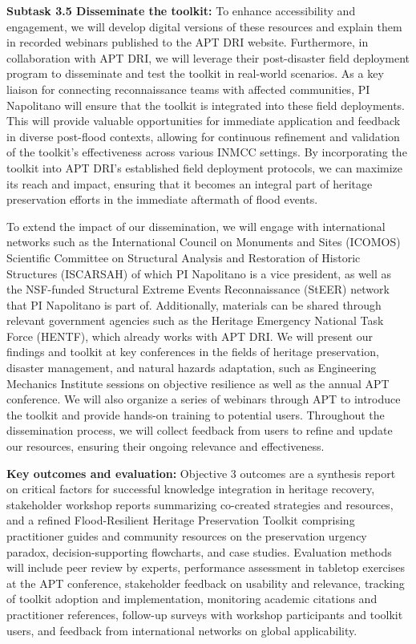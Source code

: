\documentclass[11pt]{article}
\begin{document}
\textbf{Subtask 3.5 Disseminate the toolkit:}
To enhance accessibility and engagement, we will develop digital versions of these resources and explain them in recorded webinars published to the APT DRI website. 
Furthermore, in collaboration with APT DRI, we will leverage their post-disaster field deployment program to disseminate and test the toolkit in real-world scenarios. 
As a key liaison for connecting reconnaissance teams with affected communities, PI Napolitano will ensure that the toolkit is integrated into these field deployments. 
This will provide valuable opportunities for immediate application and feedback in diverse post-flood contexts, allowing for continuous refinement and validation of the toolkit's effectiveness across various INMCC settings. 
By incorporating the toolkit into APT DRI's established field deployment protocols, we can maximize its reach and impact, ensuring that it becomes an integral part of heritage preservation efforts in the immediate aftermath of flood events.

To extend the impact of our dissemination, we will engage with international networks such as the International Council on Monuments and Sites (ICOMOS) Scientific Committee on Structural Analysis and Restoration of Historic Structures (ISCARSAH) of which PI Napolitano is a vice president, as well as the NSF-funded Structural Extreme Events Reconnaissance (StEER) network that PI Napolitano is part of. 
Additionally, materials can be shared through relevant government agencies such as the Heritage Emergency National Task Force (HENTF), which already works with APT DRI. 
We will present our findings and toolkit at key conferences in the fields of heritage preservation, disaster management, and natural hazards adaptation, such as Engineering Mechanics Institute sessions on objective resilience as well as the annual APT conference. 
We will also organize a series of webinars through APT to introduce the toolkit and provide hands-on training to potential users. 
Throughout the dissemination process, we will collect feedback from users to refine and update our resources, ensuring their ongoing relevance and effectiveness.

\textbf{Key outcomes and evaluation:} 
Objective 3 outcomes are a synthesis report on critical factors for successful knowledge integration in heritage recovery, stakeholder workshop reports summarizing co-created strategies and resources, and a refined Flood-Resilient Heritage Preservation Toolkit comprising practitioner guides and community resources on the preservation urgency paradox, decision-supporting flowcharts, and case studies. 
Evaluation methods will include peer review by experts, performance assessment in tabletop exercises at the APT conference, stakeholder feedback on usability and relevance, tracking of toolkit adoption and implementation, monitoring academic citations and practitioner references, follow-up surveys with workshop participants and toolkit users, and feedback from international networks on global applicability.
\end{document}
